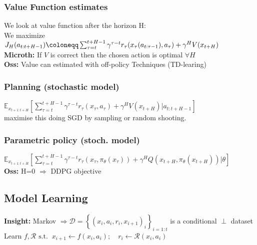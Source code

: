 \subsubsection{Value Function estimates}
We look at value function after the horizon H: \\
We maximize $J_H(a_{t:t+H-1}) \coloneqq\\ \sum_{\tau = t}^{t+H-1}\gamma^{\tau - t}r_\tau(x_\tau (a_{t:\tau-1}), a_\tau) + \gamma^H V(x_{t+H})$\\
\textbf{Microth:} If $V$ is correct then the chosen action is optimal $\forall H$\\
\textbf{Oss:} Value can estimated with off-policy Techniques (TD-learing)

\subsubsection{Planning (stochastic model)} \label{pl}
{\scriptsize $\mathbb{E}_{x_{t+1:t+H}}\left[ \sum\limits_{\tau = t}^{t+H-1}\gamma^{\tau - t}r_\tau(x_\tau, a_\tau) + \gamma^H V(x_{t+H})\vert a_{t:t+H-1}\right]$}\\
maximise this doing SGD by sampling or random shooting.

\subsubsection{Parametric policy (stoch. model)}
{\scriptsize $\mathbb{E}_{x_{t+1:t+H}}\left[ \sum\limits_{\tau = t}^{t+H-1}\gamma^{\tau - t}r_\tau(x_\tau, \pi_\theta(x_\tau)) + \gamma^H Q(x_{t+H}, \pi_\theta(x_{t+H}))\vert \theta\right]$}\\
\textbf{Oss:} H=0 $\Rightarrow$ DDPG objective

\subsection{Model Learning}
\textbf{Insight:} Markov $\Rightarrow \mathcal{D} = \left\{(x_i,a_i,r_i,x_{i+1})_i\right\}_{i=1:t}$ is a conditional $\perp$ dataset\\
Learn $f, \mathcal{R}\text{ s.t.} \;\; x_{i+1} \gets f(x_i,a_i);\quad r_i \gets \mathcal{R}(x_i,a_i)$ 

